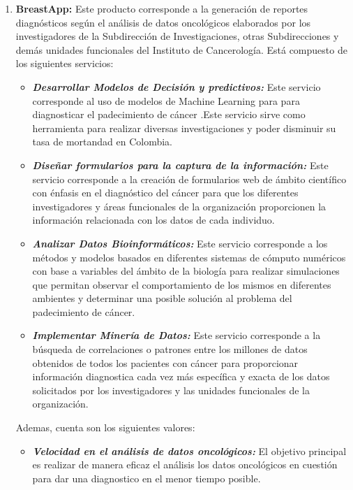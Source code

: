 \begin{enumerate}[label=\textbf{\arabic*})]
	
	\item  \textbf{BreastApp:} Este producto corresponde a la generación de reportes diagnósticos según el análisis de datos oncológicos elaborados por los investigadores de la Subdirección de Investigaciones, otras Subdirecciones y demás unidades funcionales del Instituto  de Cancerología. Está compuesto de los siguientes servicios:
	
\begin{itemize}
	\item  \textbf{\textit{Desarrollar Modelos de Decisión y predictivos:}} Este servicio corresponde al uso de modelos de Machine Learning para  para diagnosticar  el padecimiento de cáncer .Este servicio sirve como herramienta para realizar diversas investigaciones y poder  disminuir su tasa de mortandad en Colombia.
	
	\item  \textbf{\textit{Diseñar formularios para la captura de la información:}} Este servicio corresponde a la creación de formularios web de ámbito científico con énfasis en el diagnóstico del cáncer para que los diferentes investigadores y áreas funcionales de la organización proporcionen la información relacionada con los datos de cada individuo.
	
	\item  \textbf{\textit{Analizar Datos Bioinformáticos:}} Este servicio corresponde a los métodos y modelos basados en diferentes sistemas de cómputo numéricos con base a variables del ámbito de la biología para realizar simulaciones que permitan observar el comportamiento de los mismos en diferentes ambientes y determinar una posible solución al problema del padecimiento de cáncer.
	
	\item  \textbf{\textit{Implementar Minería de Datos:}} Este servicio corresponde a la búsqueda de  correlaciones o patrones entre los millones de datos obtenidos de todos los pacientes con cáncer para proporcionar información diagnostica cada vez más específica y exacta de los datos solicitados por los investigadores y las unidades funcionales de la organización.
\end{itemize}
	Ademas, cuenta son los siguientes valores:
\begin{itemize}
		\item  \textbf{\textit{Velocidad en el análisis de datos oncológicos:}} El objetivo principal es realizar de manera eficaz el análisis los datos oncológicos en cuestión para dar una diagnostico  en el menor tiempo posible.
		

\end{itemize}
\end{enumerate}
